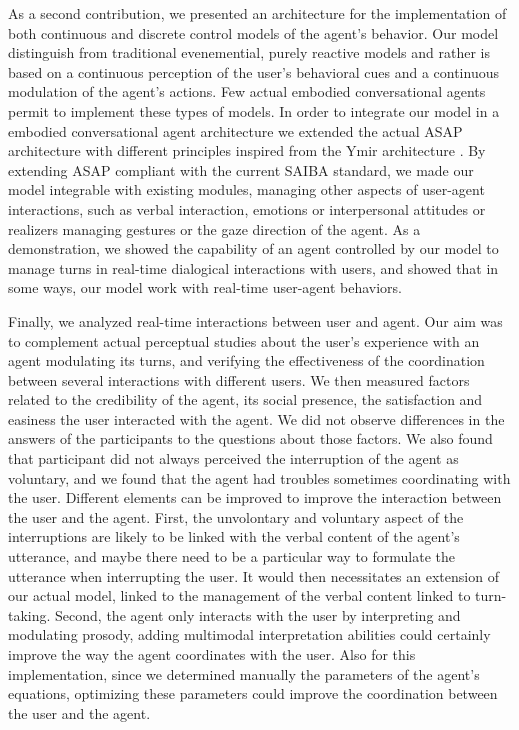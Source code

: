 As a second contribution, we presented an architecture for the implementation of both continuous and discrete control models of the agent's behavior. Our model distinguish from traditional evenemential, purely reactive models and rather is based on a continuous perception of the user's behavioral cues and a continuous modulation of the agent's actions. Few actual embodied conversational agents permit to implement these types of models. In order to integrate our model in a embodied conversational agent architecture we extended the actual ASAP architecture \cite{kopp_architecture_2014} with different principles inspired from the Ymir architecture \citep{thorisson_mind_1999}. By extending ASAP compliant with the current SAIBA standard, we made our model integrable with existing modules, managing other aspects of user-agent interactions, such as verbal interaction, emotions or interpersonal attitudes or realizers managing gestures or the gaze direction of the agent. As a demonstration, we showed the capability of an agent controlled by our model to manage turns in real-time dialogical interactions with users, and showed that in some ways, our model work with real-time user-agent behaviors. 

Finally, we analyzed real-time interactions between user and agent. Our aim was to complement actual perceptual studies about the user's experience with an agent modulating its turns, and verifying the effectiveness of the coordination between several interactions with different users. We then measured factors related to the credibility of the agent, its social presence, the satisfaction and easiness the user interacted with the agent.  We did not observe differences in the answers of the participants to the questions about those factors. We also found that participant did not always perceived the interruption of the agent as voluntary, and we found that the agent had troubles sometimes coordinating with the user. Different elements can be improved to improve the interaction between the user and the agent. First, the unvolontary and voluntary aspect of the interruptions are likely to be linked with the verbal content of the agent's utterance, and maybe there need to be a particular way to formulate the utterance when interrupting the user. It would then necessitates an extension of our actual model, linked to the management of the verbal content linked to turn-taking. Second, the agent only interacts with the user by interpreting and modulating prosody, adding multimodal interpretation abilities could certainly improve the way the agent coordinates with the user. Also for this implementation, since we determined manually the parameters of the agent's equations, optimizing these parameters could improve the coordination between the user and the agent. 

